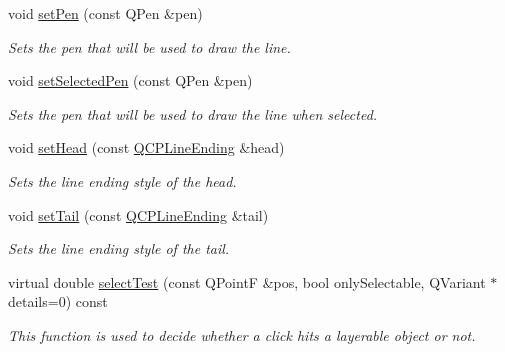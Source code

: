 \begin{DoxyCompactItemize}
\item 
void \hyperlink{classQCPItemCurve_a034be908440aec785c34b92843461221}{set\+Pen} (const Q\+Pen \&pen)
\begin{DoxyCompactList}\small\item\em Sets the pen that will be used to draw the line. \end{DoxyCompactList}\item 
void \hyperlink{classQCPItemCurve_a375b917669f868c5a106bf2f1ab7c26d}{set\+Selected\+Pen} (const Q\+Pen \&pen)
\begin{DoxyCompactList}\small\item\em Sets the pen that will be used to draw the line when selected. \end{DoxyCompactList}\item 
void \hyperlink{classQCPItemCurve_a08a30d9cdd63995deea3d9e20430676f}{set\+Head} (const \hyperlink{classQCPLineEnding}{Q\+C\+P\+Line\+Ending} \&head)
\begin{DoxyCompactList}\small\item\em Sets the line ending style of the head. \end{DoxyCompactList}\item 
void \hyperlink{classQCPItemCurve_ac3488d8b1a6489c845dc5bff3ef71124}{set\+Tail} (const \hyperlink{classQCPLineEnding}{Q\+C\+P\+Line\+Ending} \&tail)
\begin{DoxyCompactList}\small\item\em Sets the line ending style of the tail. \end{DoxyCompactList}\item 
virtual double \hyperlink{classQCPItemCurve_a741375c11667b5f9c95b2683f93ee514}{select\+Test} (const Q\+Point\+F \&pos, bool only\+Selectable, Q\+Variant $\ast$details=0) const 
\begin{DoxyCompactList}\small\item\em This function is used to decide whether a click hits a layerable object or not. \end{DoxyCompactList}\end{DoxyCompactItemize}
